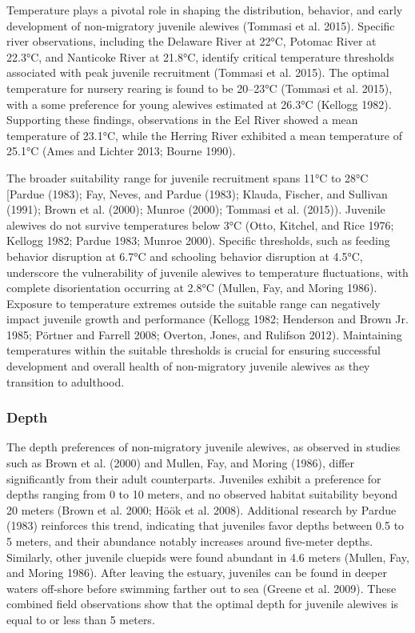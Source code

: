 \documentclass[
]{book}
\begin{document}
Temperature plays a pivotal role in shaping the distribution, behavior, and early development of non-migratory juvenile alewives (Tommasi et al. 2015). Specific river observations, including the Delaware River at 22°C, Potomac River at 22.3°C, and Nanticoke River at 21.8°C, identify critical temperature thresholds associated with peak juvenile recruitment (Tommasi et al. 2015). The optimal temperature for nursery rearing is found to be 20--23°C (Tommasi et al. 2015), with a some preference for young alewives estimated at 26.3°C (Kellogg 1982). Supporting these findings, observations in the Eel River showed a mean temperature of 23.1°C, while the Herring River exhibited a mean temperature of 25.1°C (Ames and Lichter 2013; Bourne 1990).

The broader suitability range for juvenile recruitment spans 11°C to 28°C {[}Pardue (1983); Fay, Neves, and Pardue (1983); Klauda, Fischer, and Sullivan (1991); Brown et al. (2000); Munroe (2000); Tommasi et al. (2015)). Juvenile alewives do not survive temperatures below 3°C (Otto, Kitchel, and Rice 1976; Kellogg 1982; Pardue 1983; Munroe 2000). Specific thresholds, such as feeding behavior disruption at 6.7°C and schooling behavior disruption at 4.5°C, underscore the vulnerability of juvenile alewives to temperature fluctuations, with complete disorientation occurring at 2.8°C (Mullen, Fay, and Moring 1986). Exposure to temperature extremes outside the suitable range can negatively impact juvenile growth and performance (Kellogg 1982; Henderson and Brown Jr. 1985; Pörtner and Farrell 2008; Overton, Jones, and Rulifson 2012). Maintaining temperatures within the suitable thresholds is crucial for ensuring successful development and overall health of non-migratory juvenile alewives as they transition to adulthood.

\hypertarget{depth-1}{%
\subsubsection{Depth}\label{depth-1}}

The depth preferences of non-migratory juvenile alewives, as observed in studies such as Brown et al. (2000) and Mullen, Fay, and Moring (1986), differ significantly from their adult counterparts. Juveniles exhibit a preference for depths ranging from 0 to 10 meters, and no observed habitat suitability beyond 20 meters (Brown et al. 2000; Höök et al. 2008). Additional research by Pardue (1983) reinforces this trend, indicating that juveniles favor depths between 0.5 to 5 meters, and their abundance notably increases around five-meter depths. Similarly, other juvenile cluepids were found abundant in 4.6 meters (Mullen, Fay, and Moring 1986). After leaving the estuary, juveniles can be found in deeper waters off-shore before swimming farther out to sea (Greene et al. 2009). These combined field observations show that the optimal depth for juvenile alewives is equal to or less than 5 meters.
\end{document}
